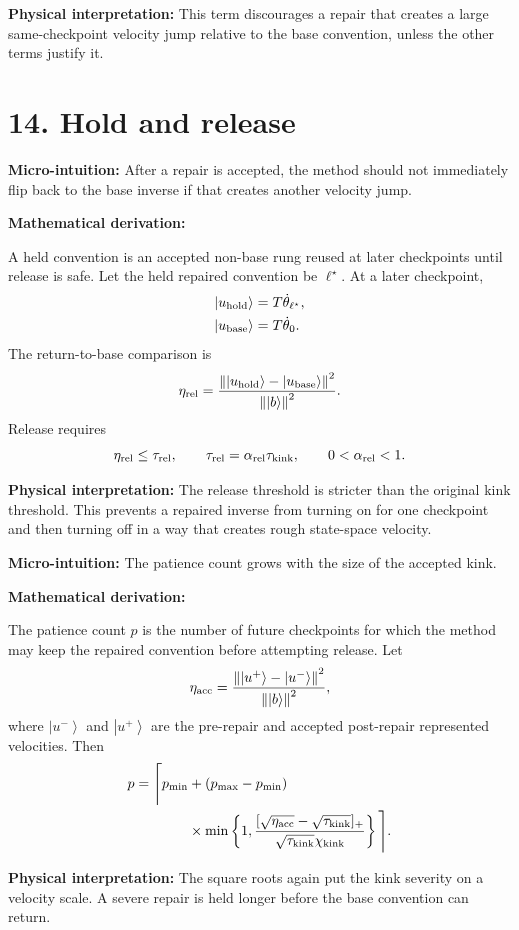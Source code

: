 \documentclass[10pt,twocolumn]{article}
\newcommand{\ket}[1]{\left|#1\right\rangle}
\newcommand{\norm}[1]{\left\lVert #1\right\rVert}
\newcommand{\micro}[1]{%
  \par\smallskip
  \noindent\textcolor{deepblue}{\textbf{Micro-intuition:}} #1
  \par\smallskip}
\newcommand{\deriv}{%
  \par\noindent\textcolor{deepviolet}{\textbf{Mathematical derivation:}}\par\vspace{-1mm}}
\newcommand{\phys}[1]{%
  \par\smallskip
  \noindent\textcolor{deepgreen}{\textbf{Physical interpretation:}} #1
  \par\smallskip}
\begin{document}
\phys{This term discourages a repair that creates a large same-checkpoint
velocity jump relative to the base convention, unless the other terms justify
it.}

\section*{14. Hold and release}

\micro{After a repair is accepted, the method should not immediately flip back
to the base inverse if that creates another velocity jump.}

\deriv
A held convention is an accepted non-base rung reused at later checkpoints
until release is safe. Let the held repaired convention be \(\ell^\star\). At a
later checkpoint,
\[
\begin{aligned}
\ket{u_{\rm hold}}&=T\dot\theta_{\ell^\star},\\
\ket{u_{\rm base}}&=T\dot\theta_0.
\end{aligned}
\]
The return-to-base comparison is
\[
\eta_{\rm rel}
=
\frac{\norm{\ket{u_{\rm hold}}-\ket{u_{\rm base}}}^2}{\norm{\ket b}^2}.
\]
Release requires
\[
\eta_{\rm rel}\le \tau_{\rm rel},
\qquad
\tau_{\rm rel}=\alpha_{\rm rel}\tau_{\rm kink},
\qquad
0<\alpha_{\rm rel}<1.
\]

\phys{The release threshold is stricter than the original kink threshold. This
prevents a repaired inverse from turning on for one checkpoint and then turning
off in a way that creates rough state-space velocity.}

\micro{The patience count grows with the size of the accepted kink.}

\deriv
The patience count \(p\) is the number of future checkpoints for which the
method may keep the repaired convention before attempting release. Let
\[
\eta_{\rm acc}
=
\frac{\norm{\ket{u^+}-\ket{u^-}}^2}{\norm{\ket b}^2},
\]
where \(\ket{u^-}\) and \(\ket{u^+}\) are the pre-repair and accepted post-repair
represented velocities. Then
\[
\begin{aligned}
p
=
\Bigg\lceil
p_{\min}
&+(p_{\max}-p_{\min})\\
&\times
\min\left\{
1,
\frac{[\sqrt{\eta_{\rm acc}}-\sqrt{\tau_{\rm kink}}]_+}
{\sqrt{\tau_{\rm kink}}\chi_{\rm kink}}
\right\}
\Bigg\rceil.
\end{aligned}
\]

\phys{The square roots again put the kink severity on a velocity scale. A severe
repair is held longer before the base convention can return.}
\end{document}

